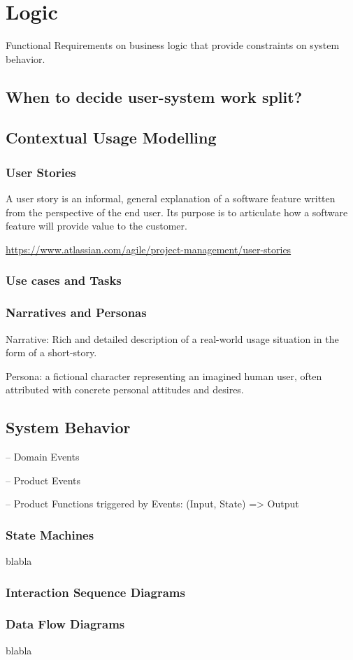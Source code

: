 
\chapter{Logic}%

Functional Requirements on business logic that provide constraints on system behavior.


\section{When to decide user-system work split?}

\section{Contextual Usage Modelling}%

\subsection{User Stories}

A user story is an informal, general explanation of a software feature written from the perspective of the end user. Its purpose is to articulate how a software feature will provide value to the customer.

\url{https://www.atlassian.com/agile/project-management/user-stories}

\subsection{Use cases and Tasks}

\subsection{Narratives and Personas}

Narrative: Rich and detailed description of a real-world usage situation in the form of a short-story.

Persona: a fictional character representing an imagined human user, often attributed with concrete personal attitudes and desires. 


\section{System Behavior}

-- Domain Events

-- Product Events

-- Product Functions triggered by Events: (Input, State) => Output

\subsection{State Machines}%
blabla 

\subsection{Interaction Sequence Diagrams}

\subsection{Data Flow Diagrams}%
blabla 


